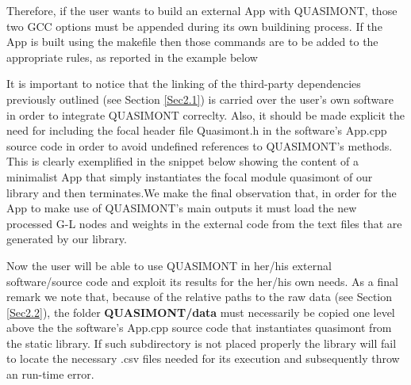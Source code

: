 \documentclass[a4paper, twosided]{book}
\begin{document}
\noindent
Therefore, if the user wants to build an external \colorbox{poliGrayBlue}{App} with QUASIMONT, those two GCC options must be appended during its own buildining process.
If the \colorbox{poliGrayBlue}{App} is built using the \colorbox{poliGrayBlue}{makefile} then those commands are to be added to the appropriate rules, as reported in the example below

\vspace{0.5cm}
\vspace{0.5cm}

\noindent
It is important to notice that the linking of the third-party dependencies previously outlined (see Section \ref{Sec2.1}) is carried over the user's own software in order to integrate QUASIMONT correclty. Also, it should be made explicit the need for including the focal header file \colorbox{poliGrayBlue}{Quasimont.h} in the software's \colorbox{poliGrayBlue}{App.cpp} source code in order to avoid undefined references to QUASIMONT's methods. This is clearly exemplified in the snippet below showing the content of a minimalist \colorbox{poliGrayBlue}{App} that simply instantiates the focal module \colorbox{poliGrayBlue}{quasimont} of our library and then terminates.We make the final observation that, in order for the \colorbox{poliGrayBlue}{App} to make use of QUASIMONT's main outputs it must load the new processed G-L nodes and weights in the external code from the text files that are generated by our library.

\newpage
{}
\vspace{0.5cm}

\noindent
Now the user will be able to use QUASIMONT in her/his external software/source code and exploit its results for the her/his own needs. As a final remark we note that, because of the relative paths to the raw data (see Section \ref{Sec2.2}), the folder \colorbox{poliGrayBlue}{\textbf{QUASIMONT/data}} must necessarily be copied one level above the the software's \colorbox{poliGrayBlue}{App.cpp} source code that instantiates \colorbox{poliGrayBlue}{quasimont} from the static library. If such subdirectory is not placed properly the library will fail to locate the necessary \colorbox{poliGrayBlue}{.csv} files needed for its execution and subsequently throw an run-time error.
\end{document}
